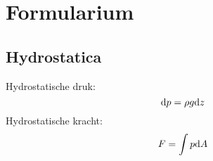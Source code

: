 \chapter{Formularium}
	\section{Hydrostatica}
\begin{multicols}{2}
	Hydrostatische druk:
	\begin{equation}
		\mathrm{d} p = \rho g \mathrm{d} z
	\end{equation}
	Hydrostatische kracht:
	\begin{equation}
		F = \int p \mathrm{d} A
	\end{equation}
\end{multicols}

